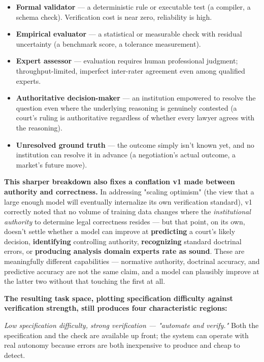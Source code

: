 \begin{itemize}
\item \textbf{Formal validator} --- a deterministic rule or executable test (a compiler, a schema check). Verification cost is near zero, reliability is high.
\item \textbf{Empirical evaluator} --- a statistical or measurable check with residual uncertainty (a benchmark score, a tolerance measurement).
\item \textbf{Expert assessor} --- evaluation requires human professional judgment; throughput-limited, imperfect inter-rater agreement even among qualified experts.
\item \textbf{Authoritative decision-maker} --- an institution empowered to resolve the question even where the underlying reasoning is genuinely contested (a court's ruling is authoritative regardless of whether every lawyer agrees with the reasoning).
\item \textbf{Unresolved ground truth} --- the outcome simply isn't known yet, and no institution can resolve it in advance (a negotiation's actual outcome, a market's future move).
\end{itemize}

\textbf{This sharper breakdown also fixes a conflation v1 made between authority and correctness.} In addressing "scaling optimism" (the view that a large enough model will eventually internalize its own verification standard), v1 correctly noted that no volume of training data changes where the \emph{institutional authority} to determine legal correctness resides --- but that point, on its own, doesn't settle whether a model can improve at \textbf{predicting} a court's likely decision, \textbf{identifying} controlling authority, \textbf{recognizing} standard doctrinal errors, or \textbf{producing analysis domain experts rate as sound}. These are meaningfully different capabilities --- normative authority, doctrinal accuracy, and predictive accuracy are not the same claim, and a model can plausibly improve at the latter two without that touching the first at all.

\textbf{The resulting task space, plotting specification difficulty against verification strength, still produces four characteristic regions:}

\emph{Low specification difficulty, strong verification --- "automate and verify."} Both the specification and the check are available up front; the system can operate with real autonomy because errors are both inexpensive to produce and cheap to detect.

